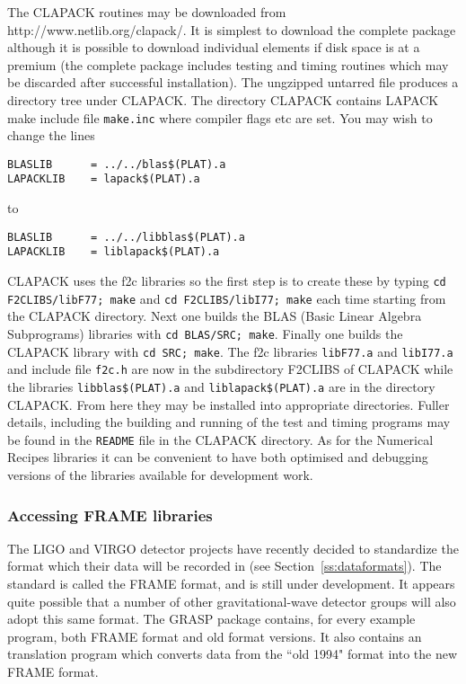 The CLAPACK routines may be downloaded from\\
{http://www.netlib.org/clapack/}.  It is simplest to download the 
complete package
 although it is possible
to download individual elements if disk space is at a premium 
(the complete package includes testing and timing routines which may
be discarded after successful installation). The ungzipped untarred 
file produces a directory tree under CLAPACK.   The directory
 CLAPACK contains LAPACK make include file {\tt make.inc} where
compiler flags etc are set.  You may wish to change the lines
\begin{verbatim}
BLASLIB      = ../../blas$(PLAT).a
LAPACKLIB    = lapack$(PLAT).a
\end{verbatim}
to 
\begin{verbatim}
BLASLIB      = ../../libblas$(PLAT).a
LAPACKLIB    = liblapack$(PLAT).a
\end{verbatim}
CLAPACK uses the f2c libraries so the first step is to create these by
typing {\tt cd F2CLIBS/libF77; make} and {\tt cd F2CLIBS/libI77; make}
each time starting from the CLAPACK directory.  Next one builds the
BLAS (Basic Linear Algebra Subprograms) libraries with {\tt cd
BLAS/SRC; make}.  Finally one builds the CLAPACK library with {\tt cd
SRC; make}.  The f2c libraries {\tt libF77.a} and {\tt libI77.a} and 
include file {\tt f2c.h} are now in the subdirectory F2CLIBS of
CLAPACK while the libraries {\tt libblas\$(PLAT).a} and {\tt liblapack\$(PLAT).a}
are in the directory CLAPACK. From here they may be installed into appropriate
directories.  Fuller details, including the building and running of the
test and timing programs may be found in the {\tt README} file in the
CLAPACK directory.  As for the Numerical Recipes
libraries it can be convenient to have both optimised and debugging
versions of the libraries available for development work.

\subsubsection{Accessing FRAME libraries}
The LIGO and VIRGO detector projects have recently decided to
standardize the format which their data will be recorded in (see
Section~\ref{ss:dataformats}).  The standard is called the FRAME format,
and is still under development.  It appears quite possible that a number
of other gravitational-wave detector groups will also adopt this same
format.  The GRASP package contains, for every example program, both FRAME
format and old format versions.  It also contains an translation program
which converts data from the ``old 1994" format into the new FRAME format.

